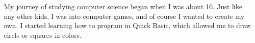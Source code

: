 
My journey of studying computer science began when I was about 10.
Just like any other kids, I was into computer games, and of course I wanted to create my own. 
I started learning how to program in Quick Basic, which allowed me to draw circls or squares in colors. 